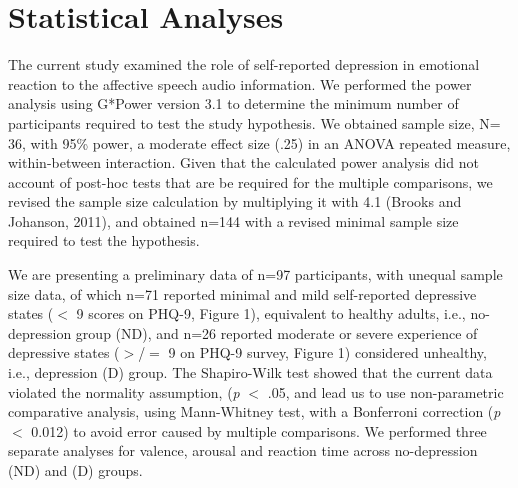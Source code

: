 \documentclass{Interspeech2024}
\begin{document}



\section{Statistical Analyses}

The current study examined the role of self-reported depression in emotional reaction to the affective speech audio information. We performed the power analysis using G*Power version 3.1 \cite{faul2007g} to determine the minimum number of participants required to test the study hypothesis. We obtained sample size, N= 36, with 95\% power, a moderate effect size (.25) in an ANOVA repeated measure, within-between interaction. Given that the calculated power analysis did not account of post-hoc tests that are be required for the multiple comparisons, we revised the sample size calculation by multiplying it with 4.1 (Brooks and Johanson, 2011), and obtained n=144 with a revised minimal sample size required to test the hypothesis. 

We are presenting a preliminary data of n=97 participants, with unequal sample size data, of which n=71 reported minimal and mild self-reported depressive states ($<$ 9 scores on PHQ-9, Figure 1), equivalent to healthy adults, i.e., no-depression group (ND), and n=26 reported moderate or severe experience of depressive states ($>$/$=$ 9 on PHQ-9 survey, Figure 1) considered unhealthy, i.e., depression (D) group. The Shapiro-Wilk test showed that the current data violated the normality assumption, (\textit{p} $<$ .05, and lead us to use non-parametric comparative analysis, using Mann-Whitney test, with a Bonferroni correction (\textit{p} $<$ 0.012) to avoid error caused by multiple comparisons. We performed three separate analyses for valence, arousal and reaction time across no-depression (ND) and  (D) groups. 
\end{document}
